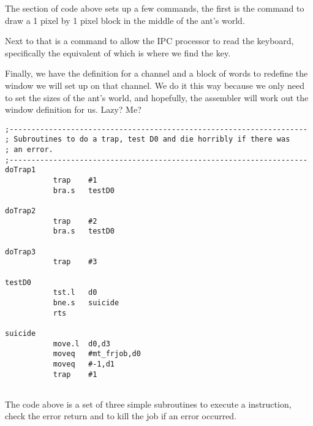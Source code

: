 The section of code above sets up a few commands, the first is the  command to draw a 1 pixel by 1 pixel block in the middle of the ant's world.

Next to that is a command to allow the IPC processor to read the keyboard, specifically the equivalent of  which is where we find the  key.

Finally, we have the definition for a  channel and a block of words to redefine the window we will set up on that channel. We do it this way because we only need to set the sizes of the ant's world, and hopefully, the assembler will work out the window definition for us. Lazy? Me?

\begin{lstlisting}[firstnumber=last,caption={Langtons Ant - Trap Subroutines}]
;--------------------------------------------------------------------
; Subroutines to do a trap, test D0 and die horribly if there was
; an error.
;--------------------------------------------------------------------
doTrap1
           trap    #1
           bra.s   testD0

doTrap2
           trap    #2
           bra.s   testD0

doTrap3
           trap    #3

testD0
           tst.l   d0
           bne.s   suicide
           rts

suicide
           move.l  d0,d3
           moveq   #mt_frjob,d0
           moveq   #-1,d1
           trap    #1


\end{lstlisting}

The code above is a set of three simple subroutines to execute a  instruction, check the error return and to kill the job if an error occurred.

